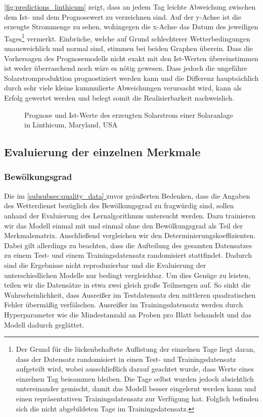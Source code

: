 \documentclass[12pt, a4paper]{article}
\newcommand*{\fullref}[1]{\hyperref[{#1}]{\autoref*{#1} \nameref*{#1}}}
\begin{document}
\autoref{fig:predictions_linthicum} zeigt, dass an jedem Tag leichte Abweichung zwischen dem Ist- und dem Prognosewert zu verzeichnen sind. Auf der y-Achse ist die erzeugte Strommenge zu sehen, wohingegen die x-Achse das Datum des jeweiligen Tages\footnote{Der Grund für die lückenbehaftete Auflistung der einzelnen Tage liegt daran, dass der Datensatz randomisiert in einen Test- und Trainingsdatensatz aufgeteilt wird, wobei ausschließlich darauf geachtet wurde, dass Werte eines einzelnen Tag beisammen bleiben. Die Tage selbst wurden jedoch absichtlich untereinander gemischt, damit das Modell besser eingelernt werden kann und einen repräsentativen Trainingsdatensatz zur Verfügung hat. Folglich befinden sich die nicht abgebildeten Tage im Trainingsdatensatz.} vermerkt. Einbrüche, welche auf Grund schlechterer Wetterbedingungen unausweichlich und normal sind, stimmen bei beiden Graphen überein. Dass die Vorhersagen des Prognosemodells nicht exakt mit den Ist-Werten übereinstimmen ist weder überraschend noch wäre es nötig gewesen. Dass jedoch die ungefähre Solarstromproduktion prognostiziert werden kann und die Differenz hauptsächlich durch sehr viele kleine kummulierte Abweichungen verursacht wird, kann als Erfolg gewertet werden und belegt somit die Realisierbarkeit nachweislich.


\begin{figure}[H]
\centering
\def\svgwidth{400pt}

\caption{Prognose und Ist-Werte des erzeugten Solarstrom einer Solaranlage in Linthicum, Maryland, USA}
\label{fig:predictions_linthicum}
\end {figure}

\subsection{Evaluierung der einzelnen Merkmale}

\subsubsection{Bewölkungsgrad}

Die im \fullref{subsubsec:quality_data} zuvor geäußerten Bedenken, dass die Angaben des Wetterdienst bezüglich des Bewölkungsgrad zu fragwürdig sind, sollen anhand der Evaluierung des Lernalgorithmus untersucht werden. Dazu trainieren wir das Modell einmal mit und einmal ohne den Bewölkungsgrad als Teil der Merkmalsmatrix. Anschließend vergleichen wir den Determinierungskoeffizienten. Dabei gilt allerdings zu beachten, dass die Aufteilung des gesamten Datensatzes zu einem Test- und einem Trainingsdatensatz randomisiert stattfindet. Dadurch sind die Ergebnisse nicht reproduzierbar und die Evaluierung der unterschiedlichen Modelle nur bedingt vergleichbar. Um dies Genüge zu leisten, teilen wir die Datensätze in etwa zwei gleich große Teilmengen auf. So sinkt die Wahrscheinlichkeit, dass Ausreißer im Testdatensatz den mittleren quadratischen Fehler übermäßig verfälschen. Ausreißer im Trainingsdatensatz werden durch Hyperparameter wie die Mindestanzahl an Proben pro Blatt behandelt und das Modell dadurch geglättet. 
\end{document}
